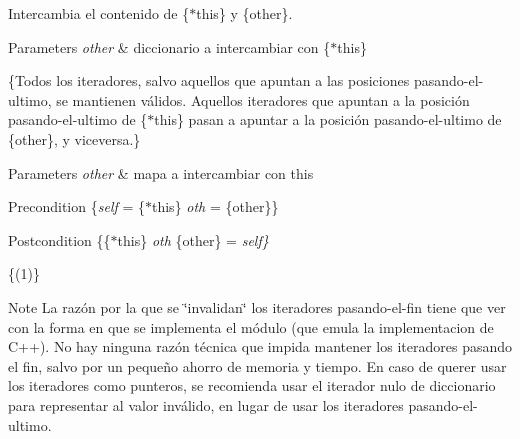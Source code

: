 Intercambia el contenido de \{$\ast$this\} y \{other\}. 


\begin{DoxyParams}{Parameters}
{\em other} & diccionario a intercambiar con \{$\ast$this\}\\
\hline
\end{DoxyParams}
\{Todos los iteradores, salvo aquellos que apuntan a las posiciones pasando-\/el-\/ultimo, se mantienen válidos. Aquellos iteradores que apuntan a la posición pasando-\/el-\/ultimo de \{$\ast$this\} pasan a apuntar a la posición pasando-\/el-\/ultimo de \{other\}, y viceversa.\}


\begin{DoxyParams}{Parameters}
{\em other} & mapa a intercambiar con this\\
\hline
\end{DoxyParams}
\begin{DoxyPrecond}{Precondition}
\{{\itshape self} = \{$\ast$this\}  {\itshape oth} = \{other\}\} 
\end{DoxyPrecond}
\begin{DoxyPostcond}{Postcondition}
\{\{$\ast$this\}  {\itshape oth}  \{other\} = {\itshape self\}} 
\end{DoxyPostcond}
\{(1)\}

\begin{DoxyNote}{Note}
La razón por la que se \char`\"{}invalidan\char`\"{} los iteradores pasando-\/el-\/fin tiene que ver con la forma en que se implementa el módulo (que emula la implementacion de C++). No hay ninguna razón técnica que impida mantener los iteradores pasando el fin, salvo por un pequeño ahorro de memoria y tiempo. En caso de querer usar los iteradores como punteros, se recomienda usar el iterador nulo de diccionario para representar al valor inválido, en lugar de usar los iteradores pasando-\/el-\/ultimo. 
\end{DoxyNote}
